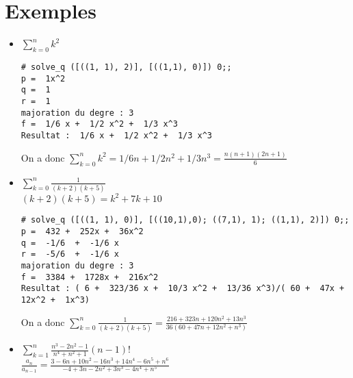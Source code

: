 \documentclass[17 pt,french]{scrartcl}
\begin{document}
  	\section*{Exemples}
  	 	\begin{itemize}
    		\item $\sum_{k=0}^n k^2$\\
    		\begin{lstlisting}
# solve_q ([((1, 1), 2)], [((1,1), 0)]) 0;;
p =  1x^2
q =  1
r =  1
majoration du degre : 3
f =  1/6 x +  1/2 x^2 +  1/3 x^3
Resultat :  1/6 x +  1/2 x^2 +  1/3 x^3
    		\end{lstlisting}
    		On a donc $\sum_{k=0}^n k^2 = 1/6 n +  1/2 n^2 +  1/3 n^3 = \frac{n(n+1)(2n+1)}{6}$
    		
    		\item $\sum_{k=0}^n \frac{1}{(k+2)(k+5)}$\\
    		$(k+2)(k+5) = k^2+7k+10$ 
    		\begin{lstlisting}
# solve_q ([((1, 1), 0)], [((10,1),0); ((7,1), 1); ((1,1), 2)]) 0;;
p =  432 +  252x +  36x^2
q =  -1/6  +  -1/6 x
r =  -5/6  +  -1/6 x
majoration du degre : 3
f =  3384 +  1728x +  216x^2
Resultat : ( 6 +  323/36 x +  10/3 x^2 +  13/36 x^3)/( 60 +  47x +  12x^2 +  1x^3)
    		\end{lstlisting}
    		On a donc $\sum_{k=0}^n \frac{1}{(k+2)(k+5)} = \frac{216+323 n+120 n^2+13 n^3}{36 \left(60+47 n+12 n^2+n^3\right)}$
    		\item $ \sum_{k=1}^n {\frac{n^3-2n^2-1}{n^4+n^2+1}(n-1)!}$ \\
    		$\frac{a_n}{a_{n-1}} = \frac{3-6 n+10 n^2-16 n^3+14 n^4-6 n^5+n^6}{-4+3 n-2 n^2+3 n^3-4 n^4+n^5} $ 
    		\end{itemize}
\end{document}
